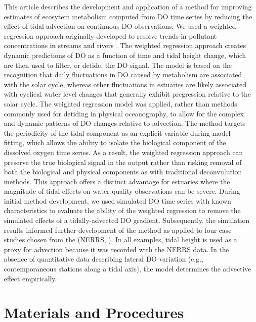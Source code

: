 \documentclass[letterpaper,12pt,oneside]{article}\usepackage[]{graphicx}\usepackage[]{color}
\begin{document}
This article describes the development and application of a method for improving estimates of ecosytem metabolism computed from \ac{DO} time series by reducing the effect of tidal advection on continuous \ac{DO} observations.  We used a weighted regression approach originally developed to resolve trends in pollutant concentrations in streams and rivers \citep{Hirsch10}.  The weighted regression approach creates dynamic predictions of \ac{DO} as a function of time and tidal height change, which are then used to filter, or detide, the \ac{DO} signal.  The model is based on the recognition that daily fluctuations in \ac{DO} caused by metabolism are associated with the solar cycle, whereas other fluctuations in estuaries are likely associated with cyclical water level changes that generally exhibit pregression relative to the solar cycle.  The weighted regression model was applied, rather than methods commonly used for detiding in physical oceanography, to allow for the complex and dynamic patterns of \ac{DO} changes relative to advection.  The method targets the periodicity of the tidal component as an explicit variable during model fitting, which allows the ability to isolate the biological component of the dissolved oxygen time series.  As a result, the weighted regression approach can preserve the true biological signal in the output rather than risking removal of both the biological and physical components as with traditional deconvulution methods.  This approach offers a distinct advantage for estuaries where the magnitude of tidal effects on water quality observations can be severe.  During initial method development, we used simulated \ac{DO} time series with known characteristics to evaluate the ability of the weighted regression to remove the simulated effects of a tidally-advected \ac{DO} gradient.  Subsequently, the simulation results informed further development of the method as applied to four case studies chosen from the  (\acs{NERRS}, \citealt{Wenner04}).  In all examples, tidal height is used as a proxy for advection because it was recorded with the \ac{NERRS} data.  In the absence of quantitative data describing lateral \ac{DO} variation (e.g., contemporaneous stations along a tidal axis), the model determines the advective effect empirically.

\section{Materials and Procedures}
\end{document}
